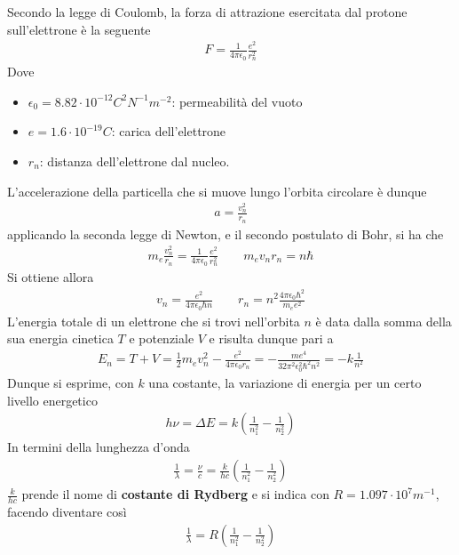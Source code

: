 \documentclass[a4paper, oneside]{book}
\begin{document}
Secondo la legge di Coulomb, la forza di attrazione esercitata dal protone
sull'elettrone è la seguente
\begin{gather*}
    F = \frac{1}{4\pi\epsilon_0} \frac{e^{2}}{r_n^{2}}
\end{gather*}
Dove
\begin{itemize}
    \item $\epsilon_0 = 8.82 \cdot 10^{-12} C^{2}N^{-1}m^{-2}$: permeabilità del vuoto
    \item $e = 1.6 \cdot 10^{-19} C$: carica dell'elettrone
    \item $r_n$: distanza dell'elettrone dal nucleo.  
\end{itemize}
L'accelerazione della particella che si muove lungo l'orbita circolare è dunque
\begin{gather*}
    a = \frac{v_n^{2}}{r_n}
\end{gather*}
applicando la seconda legge di Newton, e il secondo postulato di Bohr, si ha che
\begin{gather*}
    m_e \frac{v_n^{2}}{r_n} = \frac{1}{4\pi\epsilon_0} \frac{e^{2}}{r_n^{2}} \qquad m_e v_nr_n = n\hbar
\end{gather*}
Si ottiene allora 
\begin{gather*}
    v_n = \frac{e^{2}}{4\pi\epsilon_0 \hbar n} \qquad r_n = n^2 \frac{4\pi\epsilon_0\hbar^{2}}{m_ee^{2}}
\end{gather*}
L'energia totale di un elettrone che si trovi nell'orbita $n$ è data dalla somma della 
sua energia cinetica $T$ e potenziale $V$ e risulta dunque pari a 
\begin{gather*}
    E_n = T + V = \frac{1}{2}m_ev_n^{2}- \frac{e^{2}}{4\pi\epsilon_0r_n} = -\frac{me^{4}}{32\pi^{2}\epsilon_0^{2}\hbar^{2}n^{2}} = -k\frac{1}{n^{2}}
\end{gather*}
Dunque si esprime, con $k$ una costante, la variazione di energia per un certo livello energetico
\begin{gather*}
    h\nu = \Delta E = k\left(\frac{1}{n_1^{2}} - \frac{1}{n_2^{2}}\right)
\end{gather*} 
In termini della lunghezza d'onda
\begin{gather*}
    \frac{1}{\lambda} = \frac{\nu}{c} = \frac{k}{hc} \left(\frac{1}{n_1^{2}} - \frac{1}{n_2^{2}}\right)
\end{gather*}
$\frac{k}{hc}$ prende il nome di \textbf{costante di Rydberg} e si indica con $R = 1.097 \cdot 10^{7} m^{-1}$, facendo diventare
così
\begin{align}
    \frac{1}{\lambda} = R\left(\frac{1}{n_1^{2}} - \frac{1}{n_2^{2}}\right)
\end{align} 
\end{document}

